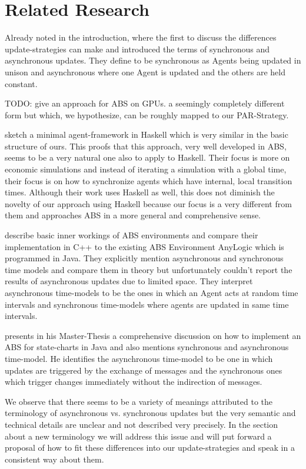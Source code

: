 \section{Related Research}
Already noted in the introduction, \cite{huberman_evolutionary_1993} where the first to discuss the differences update-strategies can make and introduced the terms of synchronous and asynchronous updates. They define to be synchronous as Agents being updated in unison and asynchronous where one Agent is updated and the others are held constant.

\medskip

TODO: \cite{a_framework_2008} give an approach for ABS on GPUs. a seemingly completely different form but which, we hypothesize, can be roughly mapped to our PAR-Strategy. 
	
\medskip
	
\cite{botta_time_2010} sketch a minimal agent-framework in Haskell which is very similar in the basic structure of ours. This proofs that this approach, very well developed in ABS, seems to be a very natural one also to apply to Haskell. Their focus is more on economic simulations and instead of iterating a simulation with a global time, their focus is on how to synchronize agents which have internal, local transition times. Although their work uses Haskell as well, this does not diminish the novelty of our approach using Haskell because our focus is a very different from them and approaches ABS in a more general and comprehensive sense.

\medskip

\cite{dawson_opening_2014} describe basic inner workings of ABS environments and compare their implementation in C++ to the existing ABS Environment AnyLogic which is programmed in Java. They explicitly mention asynchronous and synchronous time models and compare them in theory but unfortunately couldn't report the results of asynchronous updates due to limited space. They interpret asynchronous time-models to be the ones in which an Agent acts at random time intervals and synchronous time-models where agents are updated in same time intervals.

\medskip

\cite{yuxuan_agent-based_2016} presents in his Master-Thesis a comprehensive discussion on how to implement an ABS for state-charts in Java and also mentions synchronous and asynchronous time-model. He identifies the asynchronous time-model to be one in which updates are triggered by the exchange of messages and the synchronous ones which trigger changes immediately without the indirection of messages.

\medskip

We observe that there seems to be a variety of meanings attributed to the terminology of asynchronous vs. synchronous updates but the very semantic and technical details are unclear and not described very precisely. In the section about a new terminology we will address this issue and will put forward a proposal of how to fit these differences into our update-strategies and speak in a consistent way about them.